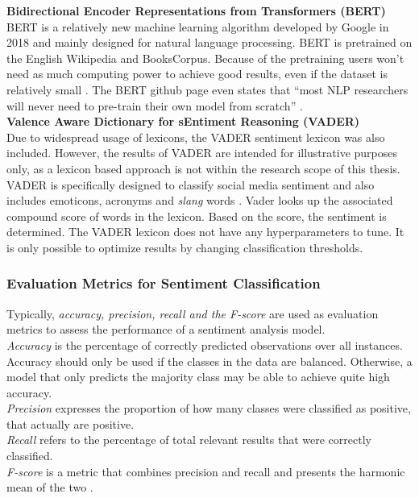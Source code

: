 \documentclass[11pt, a4paper]{article}
\begin{document}
\noindent\textbf{Bidirectional Encoder Representations from Transformers (BERT)}\\
BERT is a relatively new machine learning algorithm developed by Google in 2018 and mainly designed for 
natural language processing. BERT is pretrained on the English Wikipedia and BooksCorpus. Because of the 
pretraining users won't need as much computing power to achieve good results, even if the dataset is relatively 
small \citep{devlin2019bert}. The BERT github page even states that 
“most NLP researchers will never need to pre-train their own model from scratch” \citep{googlegithub}.\\

\noindent\textbf{Valence Aware Dictionary for sEntiment Reasoning (VADER)}\\
Due to widespread usage of lexicons, the VADER sentiment lexicon was also included. However, the results of VADER are intended for illustrative purposes only,
as a lexicon based approach is not within the research scope of this thesis.
VADER is specifically designed to classify social media sentiment and also includes emoticons, acronyms and \emph{slang} words \citep{hutto2015vader}. 
Vader looks up the associated compound score of words in the lexicon. Based on the score, the sentiment is determined.
The VADER lexicon does not have any hyperparameters to tune. It is only possible to optimize results by
changing classification thresholds.

\subsubsection{Evaluation Metrics for Sentiment Classification}
Typically, \emph{accuracy, precision, recall and the F-score} are used as evaluation metrics to assess the performance of a sentiment analysis model. \\
\emph{Accuracy} is the percentage of correctly predicted observations over all instances. Accuracy should only be used if the classes in the data are balanced.
Otherwise, a model that only predicts the majority class may be able to achieve quite high accuracy.\\
\emph{Precision} expresses the proportion of how many classes were classified as positive, that actually are positive.\\
\emph{Recall} refers to the percentage of total relevant results that were correctly classified.\\
\emph{F-score} is a metric that combines precision and recall and presents the harmonic mean of the two \citep{hossin2015evaluationmetrics}.
\end{document}
